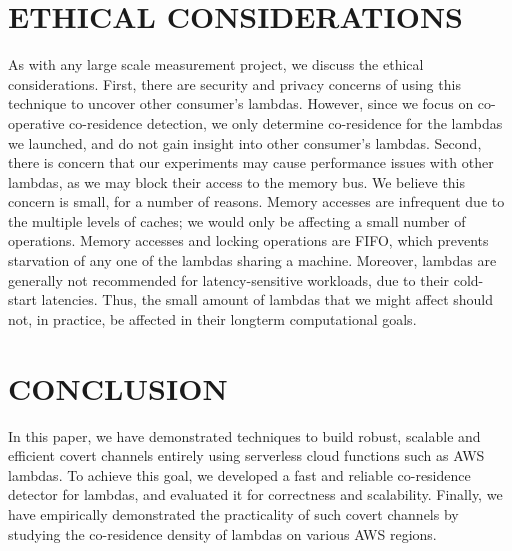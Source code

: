 
\section{ETHICAL CONSIDERATIONS}
As with any large scale measurement project, we discuss the ethical
considerations. First, there are security and privacy concerns of using this
technique to uncover other consumer's lambdas. However, since we focus on
co-operative co-residence detection, we only determine co-residence for the
lambdas we launched, and do not gain insight into other consumer's lambdas.
Second, there is concern that our experiments may cause performance issues with
other lambdas, as we may block their access to the memory bus. We believe this
concern is small, for a number of reasons. Memory accesses are infrequent due to
the multiple levels of caches; we would only be affecting a small number of
operations. Memory accesses and locking operations are FIFO, which prevents
starvation of any one of the lambdas sharing a machine. Moreover, lambdas are
generally not recommended for latency-sensitive workloads, due to their
cold-start latencies. Thus, the small amount of lambdas that we might affect
should not, in practice, be affected in their longterm computational goals. 


\section{CONCLUSION}
\label{sec:conclusion}
In this paper, we have demonstrated techniques to build robust, scalable and 
efficient covert channels entirely using serverless cloud functions such as 
AWS lambdas. To achieve this goal, we developed a fast and reliable co-residence 
detector for lambdas, and evaluated it for correctness and scalability.
Finally, we have empirically demonstrated the practicality of such covert 
channels by studying the co-residence density of lambdas on various AWS regions. 


